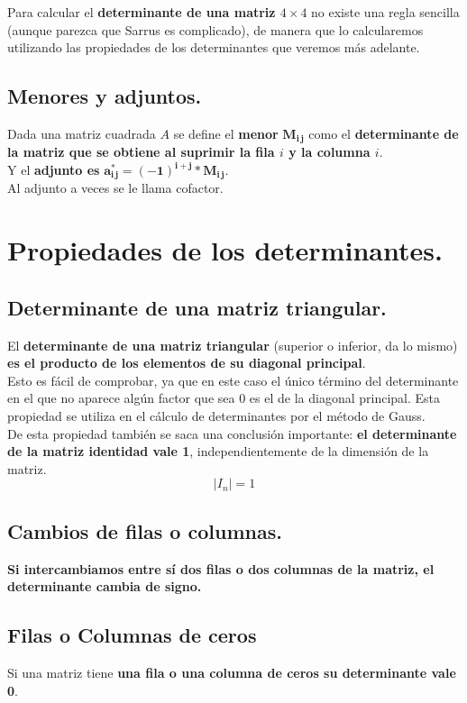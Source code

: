 \documentclass[a4paper,11pt,answers]{exam}
\newcommand\adjunto[1]{#1^\text{*}}
\begin{document}
Para calcular el \textbf{determinante de una matriz $4\times4$} no existe una regla sencilla (aunque parezca que Sarrus es complicado), de manera que lo
calcularemos utilizando las propiedades de los determinantes que veremos más adelante.
\subsection{Menores y adjuntos.}
Dada una matriz cuadrada $A$ se define el \textbf{menor} $\boldsymbol{M_{i\,j}}$ como el \textbf{determinante de la matriz que se obtiene al suprimir la fila $i$ y la columna $i$}.\\

Y el \textbf{adjunto es} $\boldsymbol{\adjunto{a_{i\,j}}= (-1)^{i+j}*M_{i\,j}}$.\\
Al adjunto a veces se le llama cofactor.\\

\section{Propiedades de los determinantes.}
\subsection{Determinante de una matriz triangular.}
El \textbf{determinante de una matriz triangular} (superior o inferior, da lo mismo) \textbf{es el producto de los elementos de su diagonal principal}.\\
Esto es fácil de comprobar, ya que en este caso el único término del determinante en el que no aparece algún factor que sea 0 es el de la diagonal principal.
Esta propiedad se utiliza en el cálculo de determinantes por el método de Gauss.\\

De esta propiedad también se saca una conclusión importante: \textbf{el determinante de la matriz identidad vale 1}, independientemente de la dimensión de la matriz.
\[|I_n| = 1\]
\subsection{Cambios de filas o columnas.}
\textbf{Si intercambiamos entre sí dos filas o dos columnas de la matriz, el determinante cambia de signo.}

\subsection{Filas o Columnas de ceros}
Si una matriz tiene \textbf{una fila o una columna de ceros su determinante vale 0}.\\
\end{document}
